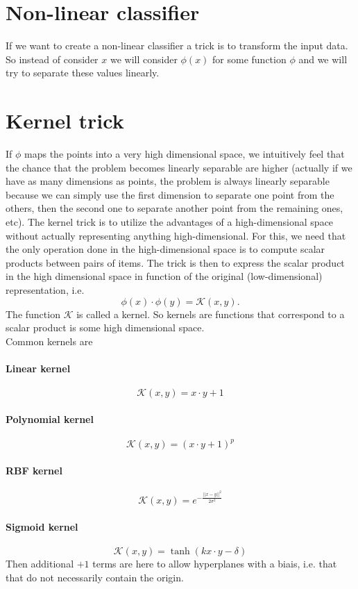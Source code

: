 \documentclass{article}
\begin{document}
\section{Non-linear classifier}
If we want to create a non-linear classifier a trick is to transform the input data. So instead of consider $x$ we will consider $\phi(x)$ for some function $\phi$ and we will try to separate these values linearly.

\section{Kernel trick}
If $\phi$ maps the points into a very high dimensional space, we intuitively feel that the chance that the problem becomes linearly separable are higher (actually if we have as many dimensions as points, the problem is always linearly separable because we can simply use the first dimension to separate one point from the others, then the second one to separate another point from the remaining ones, etc). The kernel trick is to utilize the advantages of a high-dimensional space without actually representing anything high-dimensional. For this, we need that the only operation done in the high-dimensional space is to compute scalar products between pairs of items. The trick is then to express the scalar product in the high dimensional space in function of the original (low-dimensional) representation, i.e.
$$\phi(x) \cdot \phi(y) = \mathcal{K}(x,y).$$
The function $\mathcal{K}$ is called a kernel. So kernels are functions that correspond to a scalar product is some high dimensional space.\\

Common kernels are
\paragraph{Linear kernel}
$$\mathcal{K}(x,y) = x \cdot y + 1$$
\paragraph{Polynomial kernel}
$$\mathcal{K}(x,y) = (x \cdot y + 1)^p$$
\paragraph{RBF kernel}
$$\mathcal{K}(x,y) = e^{-\frac{||x-y||^2}{2\sigma^2}}$$
\paragraph{Sigmoid kernel}
$$\mathcal{K}(x,y)  = \tanh(k x \cdot y - \delta)$$
Then additional $+1$ terms are here to allow hyperplanes with a biais, i.e. that that do not necessarily contain the origin.\\
\end{document}
